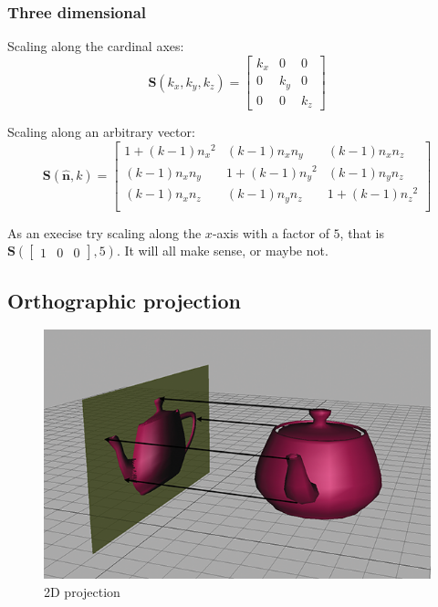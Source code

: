\documentclass[11pt]{article}
\begin{document}
\subsubsection{Three dimensional}

Scaling along the cardinal axes: \\
$$
\mathbf{S}(k_{x},k_{y},k_{z}) = 
\begin{bmatrix}
k_{x} & 0 & 0 \\
0 & k_{y} & 0 \\
0 & 0 & k_{z}
\end{bmatrix}
$$

Scaling along an arbitrary vector: \\
$$
\mathbf{S}(\hat{\mathbf{n}},k) = \begin{bmatrix}
{1 + \left( k - 1 \right){n_{x}}^{2}} & {\left( k - 1 \right)n_{x}n_{y}} & {\left( k - 1 \right)n_{x}n_{z}} \\
{\left( k - 1 \right)n_{x}n_{y}} & {1 + \left( k - 1 \right){n_{y}}^{2}} & {\left( k - 1 \right)n_{y}n_{z}} \\
{\left( k - 1 \right)n_{x}n_{z}} & {\left( k - 1 \right)n_{y}n_{z}} & {1 + \left( k - 1 \right){n_{z}}^{2}} \\
\end{bmatrix}
$$

As an execise try scaling along the $x$-axis with a factor of $5$, that is $\mathbf{S}(
\begin{bmatrix}
1 & 0 & 0
\end{bmatrix},5)$. It will all make sense, or maybe not.

\subsection{Orthographic projection}

\begin{figure}[H]
\centering
    \includegraphics{05_projection}
\caption{2D projection}
\label{fig:2d-projection}
\end{figure}
\end{document}
